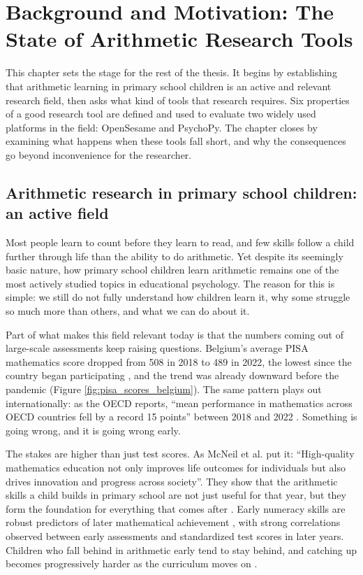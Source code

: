 \chapter{Background and Motivation: The State of Arithmetic Research Tools}
\label{chp:background}
This chapter sets the stage for the rest of the thesis. It begins by establishing that arithmetic learning in primary school children is an active and relevant research field, then asks what kind of tools that research requires. Six properties of a good research tool are defined and used to evaluate two widely used platforms in the field: OpenSesame and PsychoPy. The chapter closes by examining what happens when these tools fall short, and why the consequences go beyond inconvenience for the researcher.

\section{Arithmetic research in primary school children: an active field}
Most people learn to count before they learn to read, and few skills follow a child further through life than the ability to do arithmetic. Yet despite its seemingly basic nature, how primary school children learn arithmetic remains one of the most actively studied topics in educational psychology. The reason for this is simple: we still do not fully understand how children learn it, why some struggle so much more than others, and what we can do about it.

Part of what makes this field relevant today is that the numbers coming out of large-scale assessments keep raising questions. Belgium's average PISA mathematics score dropped from 508 in 2018 to 489 in 2022, the lowest since the country began participating \cite{globaleconomy2022belgium}, and the trend was already downward before the pandemic (Figure \ref{fig:pisa_scores_belgium}). The same pattern plays out internationally: as the OECD reports, ``mean performance in mathematics across OECD countries fell by a record 15 points'' between 2018 and 2022 \cite{oecd2023pisa}. Something is going wrong, and it is going wrong early.

The stakes are higher than just test scores. As McNeil et al. \cite{ansari2025arithmetic} put it: ``High-quality mathematics education not only improves life outcomes for individuals but also drives innovation and progress across society''. They show that the arithmetic skills a child builds in primary school are not just useful for that year, but they form the foundation for everything that comes after \cite{ansari2025arithmetic}. Early numeracy skills are robust predictors of later mathematical achievement \cite{ansari2025arithmetic}, with strong correlations observed between early assessments and standardized test scores in later years. Children who fall behind in arithmetic early tend to stay behind, and catching up becomes progressively harder as the curriculum moves on \cite{ansari2025arithmetic}.

